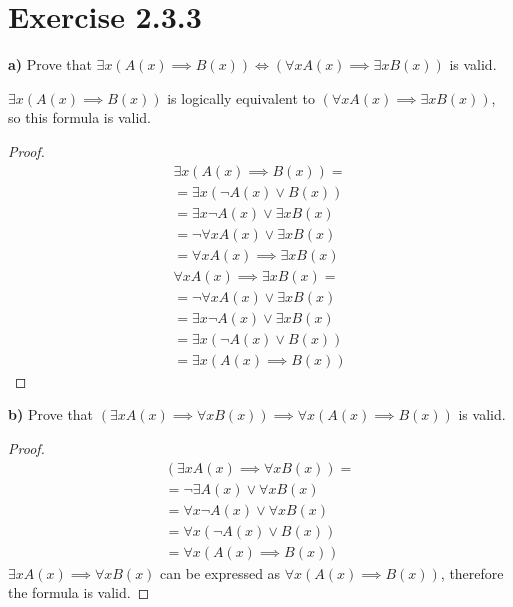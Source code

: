 \documentclass[titlepage, letterpaper, fleqn]{article}
\newcommand{\spacepls}{\vspace{5mm}}
\begin{document}
\section{Exercise 2.3.3}

{\large \textbf{a)} Prove that \(\exists x (A(x) \implies B(x)) \iff (\forall x A(x) \implies \exists x B(x))\) is valid.}

\spacepls

\(\exists x (A(x) \implies B(x))\) is logically equivalent to \((\forall x A(x) \implies \exists x B(x))\), so this formula is valid.

\begin{proof}
\begin{align*}
& \exists x (A(x) \implies B(x)) = &
\\ & = \exists x (\neg A(x) \vee B(x)) & \tag*{Material implication}
\\ & = \exists x \neg A(x) \vee \exists x B(x) & \tag*{$\exists$ distributes over $\vee$}
\\ & = \neg \forall x A(x) \vee \exists x B(x) & \tag*{Duality of quantifiers}
\\ & = \forall x A(x) \implies \exists x B(x) & \tag*{Material implication}
\end{align*}
\begin{align*}
& \forall x A(x) \implies \exists x B(x) = &
\\ & = \neg \forall x A(x) \vee \exists x B(x) & \tag*{Material implication}
\\ & = \exists x \neg A(x) \vee \exists x B(x) & \tag*{Duality of quantifiers}
\\ & = \exists x (\neg A(x) \vee B(x)) & \tag*{$\exists$ distributes over $\vee$}
\\ & = \exists x (A(x) \implies B(x)) & \tag*{Material implication}
\end{align*}
\end{proof}

\pagebreak

{\large \textbf{b)} Prove that \((\exists x A(x) \implies \forall x B(x)) \implies \forall x (A(x) \implies B(x))\) is valid.}

\spacepls

\begin{proof}
\begin{align*}
& (\exists x A(x) \implies \forall x B(x)) = &
\\ & = \neg \exists A(x) \vee \forall x B(x) & \tag*{Material implication}
\\ & = \forall x \neg A(x) \vee \forall x B(x) & \tag*{Duality of quantifiers}
\\ & = \forall x (\neg A(x) \vee B(x)) & \tag*{$\forall$ distributes over $\vee$}
\\ & = \forall x (A(x) \implies B(x)) & \tag*{Material implication}
\end{align*}
\(\exists x A(x) \implies \forall x B(x)\) can be expressed as \(\forall x (A(x) \implies B(x))\), therefore the formula is valid.
\end{proof}
\end{document}
